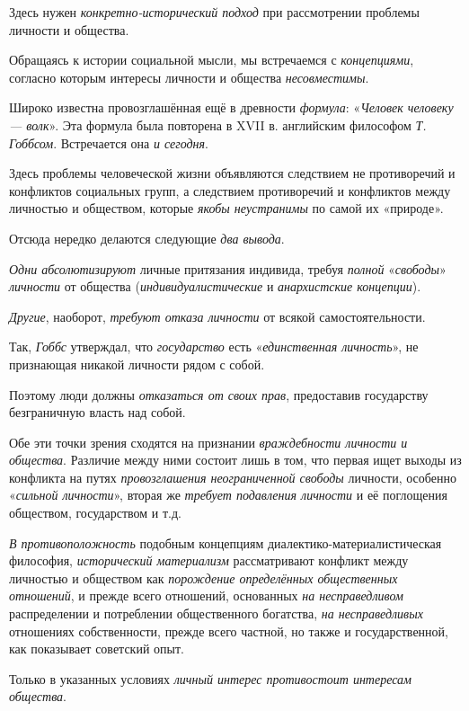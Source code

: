\documentclass[a4paper,14pt,russian]{extreport}
\begin{document}
Здесь нужен \emph{конкретно-исторический подход} при рассмотрении проблемы личности и общества.

Обращаясь к истории социальной мысли, мы встречаемся с \emph{концепциями}, согласно которым интересы личности и общества \emph{несовместимы}.

Широко известна провозглашённая ещё в древности \emph{формула}: «\emph{Человек человеку --- волк}». Эта формула была повторена в XVII в. английским философом \emph{Т. Гоббсом}. Встречается она \emph{и сегодня}.

Здесь проблемы человеческой жизни объявляются следствием не противоречий и конфликтов социальных групп, а следствием противоречий и конфликтов между личностью и обществом, которые \emph{якобы неустранимы} по самой их «природе».

Отсюда нередко делаются следующие \emph{два вывода}.

\emph{Одни абсолютизируют} личные притязания индивида, требуя \emph{полной} «\emph{свободы}» \emph{личности} от общества (\emph{индивидуалистические} и \emph{анархистские концепции}).

\emph{Другие}, наоборот, \emph{требуют отказа личности} от всякой самостоятельности.

Так, \emph{Гоббс} утверждал, что \emph{государство} есть «\emph{единственная личность}», не признающая никакой личности рядом с собой.

Поэтому люди должны \emph{отказаться от своих прав}, предоставив государству безграничную власть над собой.

Обе эти точки зрения сходятся на признании \emph{враждебности личности и общества}. Различие между ними состоит лишь в том, что первая ищет выходы из конфликта на путях \emph{провозглашения неограниченной свободы} личности, особенно «\emph{сильной личности}», вторая же \emph{требует подавления личности} и её поглощения обществом, государством и т.д.

\emph{В противоположность} подобным концепциям диалектико-материалистическая философия, \emph{исторический материализм} рассматривают конфликт между личностью и обществом как \emph{порождение определённых общественных отношений}, и прежде всего отношений, основанных \emph{на несправедливом} распределении и потреблении общественного богатства, \emph{на несправедливых} отношениях собственности, прежде всего частной, но также и государственной, как показывает советский опыт.

Только в указанных условиях \emph{личный интерес противостоит интересам общества}.
\end{document}
